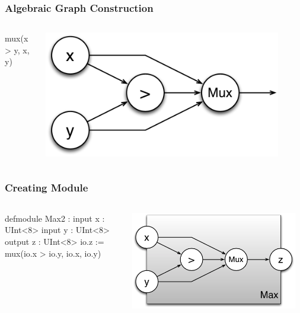 \documentclass[xcolor=pdflatex,dvipsnames,table]{beamer}
\begin{document}


\begin{frame}[fragile]
\frametitle{Algebraic Graph Construction}

\begin{columns}
{
\begin{stanza}
mux(x > y, x, y)
\end{stanza}
}


\begin{center}
\includegraphics[width=0.9\textwidth]{figs/max2.pdf} 
\end{center}
\end{columns}
\end{frame}

\begin{frame}[fragile]
\frametitle{Creating Module}

\begin{columns}

{
\begin{stanza}
defmodule Max2 :
  input x : UInt<8>
  input y : UInt<8>
  output z : UInt<8>
  io.z := mux(io.x > io.y, io.x, io.y)
\end{stanza}
}

\begin{center}
\includegraphics[width=0.95\textwidth]{figs/Max2c.pdf} \\
\end{center}
\end{columns}

\end{frame}
\end{document}
